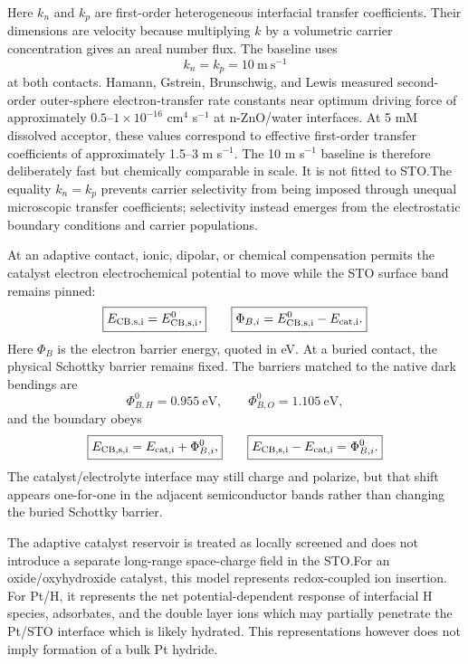 \documentclass[11pt]{article}
\begin{document}
Here $k_n$ and $k_p$ are first-order heterogeneous interfacial transfer coefficients. Their dimensions are velocity because multiplying $k$ by a volumetric carrier concentration gives an areal number flux. The baseline uses
\begin{equation}
\boxed{k_n=k_p=10~\mathrm{m~s^{-1}}}
\end{equation}
at both contacts. Hamann, Gstrein, Brunschwig, and Lewis measured second-order outer-sphere electron-transfer rate constants near optimum driving force of approximately $0.5$--$1\times10^{-16}$ cm$^4$ s$^{-1}$ at n-ZnO/water interfaces.\cite{hamann2005free,hamann2005reorg,hamann2006ph} At 5 mM dissolved acceptor, these values correspond to effective first-order transfer coefficients of approximately 1.5--3 m s$^{-1}$. The 10 m s$^{-1}$ baseline is therefore deliberately fast but chemically comparable in scale. It is not fitted to STO.\@ The equality $k_n=k_p$ prevents carrier selectivity from being imposed through unequal microscopic transfer coefficients; selectivity instead emerges from the electrostatic boundary conditions and carrier populations.

At an adaptive contact, ionic, dipolar, or chemical compensation permits the catalyst electron electrochemical potential to move while the STO surface band remains pinned:
\begin{equation}
\boxed{E_{\rm CB,s,i}=E_{\rm CB,s,i}^{0},}\qquad
\boxed{\Phi_{B,i}=E_{\rm CB,s,i}^{0}-E_{\rm cat,i}.}
\label{eq:adaptivebc}
\end{equation}
Here $\Phi_B$ is the electron barrier energy, quoted in eV. At a buried contact, the physical Schottky barrier remains fixed. The barriers matched to the native dark bendings are
\begin{equation}
\Phi_{B,H}^{0}=0.955~\mathrm{eV},\qquad
\Phi_{B,O}^{0}=1.105~\mathrm{eV},
\end{equation}
and the boundary obeys
\begin{equation}
\boxed{E_{\rm CB,s,i}=E_{\rm cat,i}+\Phi_{B,i}^{0},}\qquad
\boxed{E_{\rm CB,s,i}-E_{\rm cat,i}=\Phi_{B,i}^{0}.}
\label{eq:buriedbc}
\end{equation}
The catalyst/electrolyte interface may still charge and polarize, but that shift appears one-for-one in the adjacent semiconductor bands rather than changing the buried Schottky barrier.

The adaptive catalyst reservoir is treated as locally screened and does not introduce a separate long-range space-charge field in the STO.\@ For an oxide/oxyhydroxide catalyst, this model represents redox-coupled ion insertion. For Pt/H, it represents the net potential-dependent response of interfacial H species, adsorbates, and the double layer ions which may partially penetrate the Pt/STO interface which is likely hydrated. This representations however does not imply formation of a bulk Pt hydride.
\end{document}
